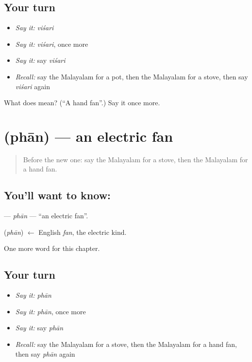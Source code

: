 \subsection*{Your turn}
\begin{itemize}
\raggedright
  \item \emph{Say it:} \emph{viśari}
  \item \emph{Say it:} \emph{viśari}, once more
  \item \emph{Say it:} say \emph{viśari}
  \item \emph{Recall:} say the Malayalam for a pot, then the Malayalam for a stove, then say \emph{viśari} again
\end{itemize}

\begin{tcolorbox}[breakable,colback=teal!4,colframe=teal!35!black,title={Before you move on}]
What does  mean? (\textquotedblleft{}A hand fan\textquotedblright{}.) Say it once more.
\end{tcolorbox}
\section[\texorpdfstring{\ml{ഫാൻ} (phān)}{ഫാൻ (phān)}]{ (phān) — an electric fan}

\label{lesson:ML-C157-phan}



\begin{quote}
Before the new one: say the Malayalam for a stove, then the Malayalam for a hand fan.
\end{quote}

\subsection*{You'll want to know: }
\textbf{} — \emph{phān} — \textquotedblleft{}an electric fan\textquotedblright{}.

\begin{cousinweb}
\textbf{} (\emph{phān}) $\leftarrow$ English \emph{fan}, the electric kind.
\end{cousinweb}

\begin{grammarlens}[title={What you've built}]
One more word for this chapter.
\end{grammarlens}

\subsection*{Your turn}
\begin{itemize}
\raggedright
  \item \emph{Say it:} \emph{phān}
  \item \emph{Say it:} \emph{phān}, once more
  \item \emph{Say it:} say \emph{phān}
  \item \emph{Recall:} say the Malayalam for a stove, then the Malayalam for a hand fan, then say \emph{phān} again
\end{itemize}

